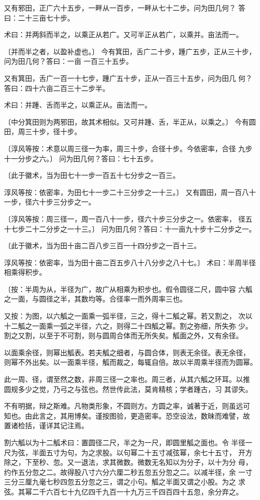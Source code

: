 \documentclass[12pt,UTF8]{ctexbook}
\begin{document}
又有邪田，正广六十五步，一畔从一百步，一畔从七十二步。问为田几何？ 答曰：二十三亩七十步。

术曰：并两斜而半之，以乘正从若广。又可半正从若广，以乘并。亩法而一。

〔并而半之者，以盈补虚也。〕 今有箕田，舌广二十步，踵广五步，正从三十步，问为田几何？答曰：一亩 一百三十五步。

又有箕田，舌广一百一十七步，踵广五十步，正从一百三十五步，问为田几 何？答曰：四十六亩二百三十二步半。

术曰：并踵、舌而半之，以乘正从。亩法而一。

〔中分箕田则为两邪田，故其术相似。又可并踵、舌，半正从，以乘之。〕 今有圆田，周三十步，径十步。

〔淳风等按：术意以周三径一为率，周三十步，合径十步。今依密率，合径 九步十一分步之六。〕 问为田几何？答曰：七十五步。

〔此于徽术，当为田七十一步一百五十七分步之一百三。

淳风等按：依密率，为田七十一步二十三分步之一十三。〕 又有圆田，周一百八十一步，径六十步三分步之一。

〔淳风等按：周三径一，周一百八十一步，径六十步三分步之一。依密率， 径五十七步二十二分步之一十三。〕 问为田几何？答曰：十一亩九十步十二分步之一。

〔此于徽术，当为田十亩二百八步三百一十四分步之一百十三。

淳风等按：依密率，当为田十亩二百五步八十八分步之八十七。〕 术曰：半周半径相乘得积步。

〔按：半周为从，半径为广，故广从相乘为积步也。假令圆径二尺，圆中容 六觚之一面，与圆径之半，其数均等。合径率一而外周率三也。

又按：为图，以六觚之一面乘一弧半径，三之，得十二觚之幂。若又割之， 次以十二觚之一面乘一弧之半径，六之，则得二十四觚之幂。割之弥细，所失弥 少。割之又割，以至于不可割，则与圆周合体而无所失矣。觚面之外，又有余径。

以面乘余径，则幂出觚表。若夫觚之细者，与圆合体，则表无余径。表无余径， 则幂不外出矣。以一面乘半径，觚而裁之，每辄自倍。故以半周乘半径而为圆幂。

此一周、径，谓至然之数，非周三径一之率也。周三者，从其六觚之环耳。以推 圆规多少之觉，乃弓之与弦也。然世传此法，莫肯精核；学者踵古，习 其谬失。

不有明据，辩之斯难。凡物类形象，不圆则方。方圆之率，诚著于近，则虽远可 知也。由此言之，其用博矣。谨按图验，更造密率。恐空设法，数昧而难譬，故 置诸检括，谨详其记注焉。

割六觚以为十二觚术曰：置圆径二尺，半之为一尺，即圆里觚之面也。令 半径一尺为弦，半面五寸为句，为之求股。以句幂二十五寸减弦幂，余七十五寸， 开方除之，下至秒、忽。又一退法，求其微数。微数无名知以为分子，以十为分 母，约作五分忽之二。故得股八寸六分六厘二秒五忽五分忽之二。以减半径，余 一寸三分三厘九毫七秒四忽五分忽之三，谓之小句。觚之半面又谓之小股。为之 求弦。其幂二千六百七十九亿四千九百一十九万三千四百四十五忽，余分弃之。
\end{document}
